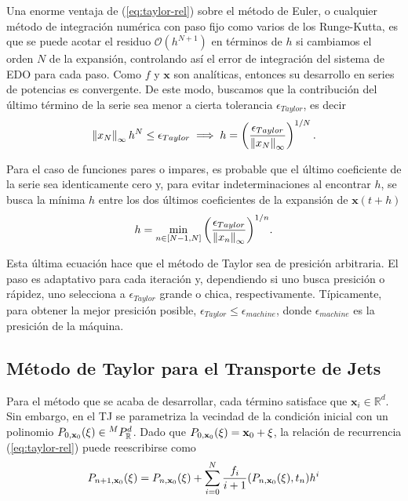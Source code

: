 Una enorme ventaja de (\ref{eq:taylor-rel}) sobre el método de Euler, o cualquier método de integración numérica con paso fijo como varios de los Runge-Kutta, es que se puede acotar el residuo $\mathcal{O}(h^{N+1})$ en términos de $h$ si cambiamos el orden $N$ de la expansión, controlando así el error de integración del sistema de EDO para cada paso. Como $f$ y $\mathbf{x}$ son analíticas, entonces su desarrollo en series de potencias es convergente. De este modo, buscamos que la contribución del último término de la serie sea menor a cierta tolerancia $\epsilon_{Taylor}$, es decir
\begin{equation*}
\left\lVert x_N\right\rVert_\infty h^N \leq \epsilon_{Taylor} \implies h = \left( \frac{\epsilon_{Taylor}}{\left\lVert x_N\right\rVert_\infty} \right)^{1/N}.
\end{equation*} 

Para el caso de funciones pares o impares, es probable que el último coeficiente de la serie sea identicamente cero y, para evitar indeterminaciones al encontrar $h$, se busca la mínima $h$ entre los dos últimos coeficientes de la expansión de $\mathbf{x}(t+h)$
\begin{equation}
h = \min_{n \in [N-1,N]}{ \left( \frac{\epsilon_{Taylor}}{\left\lVert x_n\right\rVert_\infty} \right)^{1/n} }.
\label{eq:stepsize}
\end{equation} 

Esta última ecuación hace que el método de Taylor sea de presición arbitraria. El paso es adaptativo para cada iteración y, dependiendo si uno busca presición o rápidez, uno selecciona a $\epsilon_{Taylor}$ grande o chica, respectivamente. Típicamente, para obtener la mejor presición posible, $\epsilon_{Taylor} \leq \epsilon_{machine}$, donde $\epsilon_{machine}$ es la presición de la máquina.


\subsection{Método de Taylor para el Transporte de Jets}
Para el método que se acaba de desarrollar, cada término satisface que $\mathbf{x}_i \in \mathbb{R}^d$. Sin embargo, en el TJ se parametriza la vecindad de la condición inicial con un polinomio $P_{0,\mathbf{x}_0}(\mathbf{\xi}) \in {^{M}P_{\mathbb{R}}^ d }$. Dado que $P_{0,\mathbf{x}_0}(\mathbf{\xi}) = \mathbf{x}_0 + \mathbf{\xi}$, la relación de recurrencia (\ref{eq:taylor-rel}) puede reescribirse como
\begin{equation}
P_{n+1,\mathbf{x}_0}(\xi) = P_{n,\mathbf{x}_0}(\xi) + \sum_{i=0}^N \frac{f_i}{i+1}(P_{n,\mathbf{x}_0}(\xi),t_n)h^i 
\label{eq:jt-rel}
\end{equation}

